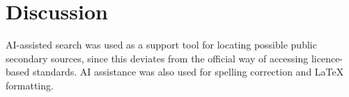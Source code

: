 \section{Discussion}
AI-assisted search was used as a support tool for locating possible public secondary
sources, since this deviates from the official way of accessing licence-based standards.
AI assistance was also used for spelling correction and LaTeX formatting. 
